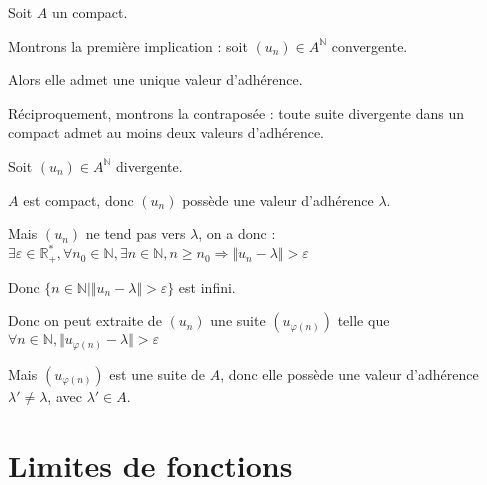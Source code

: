 \documentclass[a4paper,12pt]{book}
\newcommand{\Pre}[1]{\begin{tcolorbox}[sharp corners, colback=white,colframe=green!60!green!30!black!75, title=Preuve]#1\end{tcolorbox}}
\def\R{\mathbb{R}}
\def\N{\mathbb{N}}
\begin{document}
\Pre{Soit $A$ un compact. \par Montrons la première implication : soit $(u_n)\in A^\N$ convergente. \par Alors elle admet une unique valeur d'adhérence.
\par Réciproquement, montrons la contraposée : toute suite divergente dans un compact admet au moins deux valeurs d'adhérence. \par Soit $(u_n)\in A^\N$ divergente. \par $A$ est compact, donc $(u_n)$ possède une valeur d'adhérence $\lambda$. \par Mais $(u_n)$ ne tend pas vers $\lambda$, on a donc : $\exists\varepsilon\in\R_+^*,\forall n_0\in\N,\exists n\in\N,n\geq n_0\Rightarrow\Vert u_n-\lambda\Vert>\varepsilon$ \par Donc $\{n\in\N\vert \Vert u_n-\lambda\Vert>\varepsilon\}$ est infini. \par Donc on peut extraite de $(u_n)$ une suite $(u_{\varphi(n)})$ telle que $\forall n\in\N, \Vert u_{\varphi(n)}-\lambda\Vert>\varepsilon$ \par Mais $(u_{\varphi(n)})$ est une suite de $A$, donc elle possède une valeur d'adhérence $\lambda'\neq\lambda$, avec $\lambda'\in A$.}

\section{Limites de fonctions}
\end{document}
